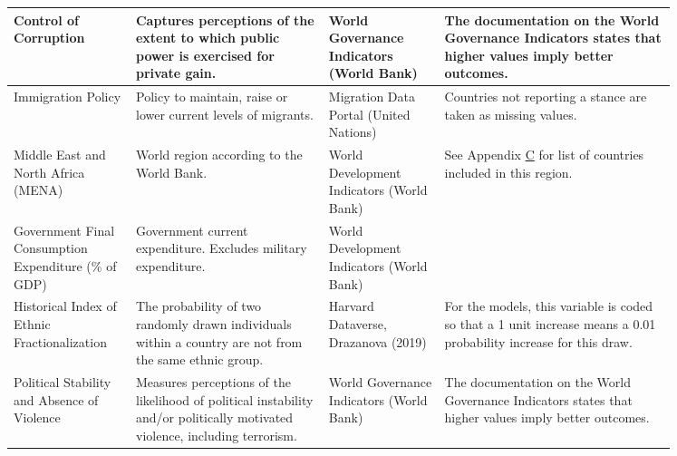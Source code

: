 \documentclass[../main.tex]{subfiles}
\begin{document}
\begin{longtable}{p{0.15\linewidth}|p{0.25\linewidth}|p{0.15\linewidth}|p{0.30\linewidth}}
Control of Corruption                                & Captures perceptions of the extent to which public power is exercised for private gain.                                                                        & World Governance Indicators (World Bank)                                      & The documentation on the World Governance Indicators \parencite{Kaufmann.September2010} states that higher values imply better outcomes.                                                                                                        \\ \midrule
Immigration Policy                      & Policy to maintain, raise or lower current levels of migrants.                                                                                         & Migration Data Portal (United Nations)                                        & Countries not reporting a stance are taken as missing values.                                                                              \\ \midrule
Middle East and North Africa (MENA)                       & World region according to the World Bank. & World Development Indicators (World Bank) & See Appendix \hyperref[sec:C]{C} for list of countries included in this region.                                                                                                \\ \midrule
Government Final Consumption Expenditure (\% of GDP) & Government current expenditure. Excludes military expenditure. & World Development Indicators (World Bank)                                     &                                                                                                                                            \\ \midrule
Historical Index of Ethnic Fractionalization         & The probability of two randomly drawn individuals within a country are not from the same ethnic group.                                                         & Harvard Dataverse, Drazanova (2019)                                           & For the models, this variable is coded so that a 1 unit increase means a 0.01 probability increase for this draw.                                                                                                                       \\ \midrule
Political Stability and Absence of Violence          & Measures perceptions of the likelihood of political instability and/or politically motivated violence, including terrorism.                                    & World Governance Indicators (World Bank)                                      & The documentation on the World Governance Indicators \parencite{Kaufmann.September2010} states that higher values imply better outcomes.\\
\end{longtable}
\end{document}

